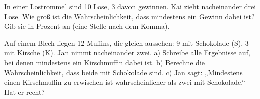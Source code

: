 \documentclass[11pt]{article}
\makeatletter
\newcommand{\aufg}[3]{\par\noindent\makebox[0pt][r]{#3}\begin{minipage}[t]{\linewidth}#1\end{minipage}\par}
\newcommand{\nr}[1]{\makebox[7mm][l]{\textbf{#1}}}
\newlength{\kr}
\newcommand{\karomerk}[2]{\protected@write\@auxout{}{\string\karoseite{#1}{#2}{\thepage}}}
\newcommand{\karoseite}[3]{\expandafter\xdef\csname karo@#1@#2\endcsname{#3}}
\makeatother
\begin{document}
\medskip
\aufg{\nr{4.}In einer Lostrommel sind 10 Lose, 3 davon gewinnen. Kai zieht nacheinander drei Lose. Wie groß ist die Wahrscheinlichkeit, dass mindestens ein Gewinn dabei ist? Gib sie in Prozent an (eine Stelle nach dem Komma).}{}{}
\medskip
\aufg{\nr{5.}Auf einem Blech liegen 12 Muffins, die gleich aussehen: 9 mit Schokolade (S), 3 mit Kirsche (K). Jan nimmt nacheinander zwei. a) Schreibe alle Ergebnisse auf, bei denen mindestens ein Kirschmuffin dabei ist. b) Berechne die Wahrscheinlichkeit, dass beide mit Schokolade sind. c) Jan sagt: „Mindestens einen Kirschmuffin zu erwischen ist wahrscheinlicher als zwei mit Schokolade.“ Hat er recht?}{}{{\scriptsize\color{mbgrau}Ziel\hspace{2mm}}}
\medskip
\par\vspace{3mm}\setlength{\kr}{\dimexpr\pagegoal-\pagetotal-10mm\relax}%
\ifdim\kr>12mm\karomerk{k}{T}\noindent{\scriptsize\color{mbgrau}Platz zum Rechnen}\par\nointerlineskip\vspace{1mm}\noindent
\begin{tikzpicture}\clip (0,0) rectangle ({\linewidth-0.5mm},\kr);\draw[black!16,line width=0.3pt,step=5mm] (0,0) grid (\linewidth,\kr);\end{tikzpicture}\fi\par
\end{document}
